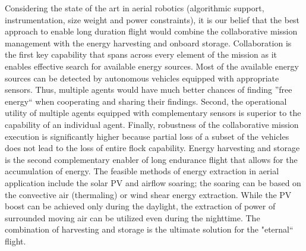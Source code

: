 \documentclass{ifacconf}
\begin{document}

Considering the state of the art in aerial robotics (algorithmic support,
instrumentation, size weight and power constraints), it is our belief that
the best approach to enable long duration flight would combine the
collaborative mission management with the energy harvesting and onboard
storage. Collaboration is the first key capability that spans across every
element of the mission as it enables effective search for available energy
sources. Most of the available energy sources can be detected by autonomous
vehicles equipped with appropriate sensors. Thus, multiple agents would have
much better chances of finding ''free energy`` when cooperating and sharing
their findings. Second, the operational utility of multiple agents equipped
with complementary sensors is superior to the capability of an individual
agent. Finally, robustness of the collaborative mission execution is
significantly higher because partial loss of a subset of the vehicles does
not lead to the loss of entire flock capability. Energy harvesting and
storage is the second complementary enabler of long endurance flight that
allows for the accumulation of energy. The feasible methods of energy
extraction in aerial application include the solar PV and airflow soaring;
the soaring can be based on the convective air (thermaling) or wind shear
energy extraction. While the PV boost can be achieved only during the
daylight, the extraction of power of surrounded moving air can be utilized
even during the nighttime. The combination of harvesting and storage is the
ultimate solution for the "eternal`` flight.

\end{document}
